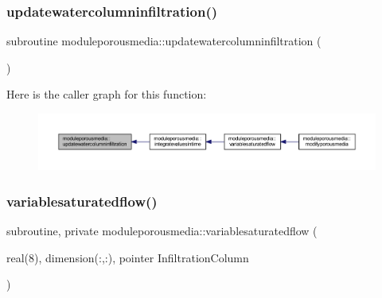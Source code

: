 \subsubsection{\texorpdfstring{updatewatercolumninfiltration()}{updatewatercolumninfiltration()}}
{\footnotesize\ttfamily subroutine moduleporousmedia\+::updatewatercolumninfiltration (\begin{DoxyParamCaption}{ }\end{DoxyParamCaption})\hspace{0.3cm}{\ttfamily [private]}}

Here is the caller graph for this function\+:\nopagebreak
\begin{figure}[H]
\begin{center}
\leavevmode
\includegraphics[width=350pt]{namespacemoduleporousmedia_a5232e9d01e4dffac7d88f9b9d10ddc3f_icgraph}
\end{center}
\end{figure}
\mbox{\label{namespacemoduleporousmedia_a616ff2e8e3230ac9ca5923369b4d8cfc}} 
\subsubsection{\texorpdfstring{variablesaturatedflow()}{variablesaturatedflow()}}
{\footnotesize\ttfamily subroutine, private moduleporousmedia\+::variablesaturatedflow (\begin{DoxyParamCaption}\item[{real(8), dimension(\+:,\+:), pointer}]{Infiltration\+Column }\end{DoxyParamCaption})\hspace{0.3cm}{\ttfamily [private]}}

